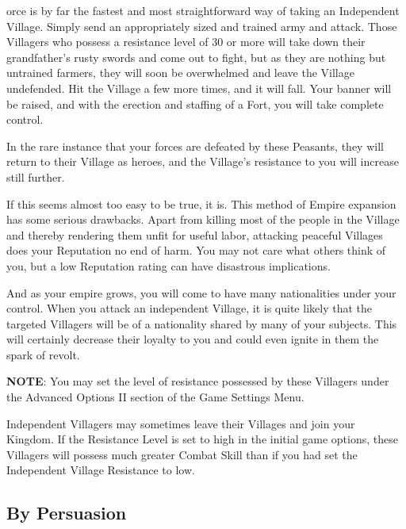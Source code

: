 
orce is by far the fastest and most straightforward way of taking an Independent Village. Simply send an appropriately sized and trained army and attack. Those Villagers who possess a resistance level of 30 or more will take down their grandfather’s rusty swords and come out to fight, but as they are nothing but untrained farmers, they will soon be overwhelmed and leave the Village undefended. Hit the Village a few more times, and it will fall. Your banner will be raised, and with the erection and staffing of a Fort, you will take complete control.

In the rare instance that your forces are defeated by these Peasants, they will return to their Village as heroes, and the Village’s resistance to you will increase still further.


If this seems almost too easy to be true, it is. This method of Empire expansion has some serious drawbacks. Apart from killing most of the people in the Village and thereby rendering them unfit for useful labor, attacking peaceful Villages does your Reputation no end of harm. You may not care what others think of you, but a low Reputation rating can have disastrous implications.

And as your empire grows, you will come to have many nationalities under your control. When you attack an independent Village, it is quite likely that the targeted Villagers will be of a nationality shared by many of your subjects. This will certainly decrease their loyalty to you and could even ignite in them the spark of revolt.

\textbf{NOTE}: You may set the level of resistance possessed by these Villagers under the Advanced Options II section of the Game Settings Menu.

Independent Villagers may sometimes leave their Villages and join your Kingdom. If the Resistance Level is set to high in the initial game options, these Villagers will possess much greater Combat Skill than if you had set the Independent Village Resistance to low.

\subsection{By Persuasion}


